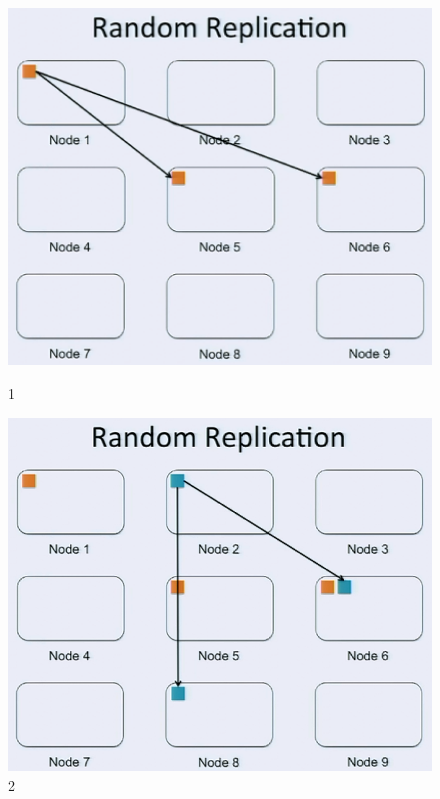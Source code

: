 \documentclass[xcolor=table]{beamer}
\begin{document}
	\begin{frame}
		\begin{figure}[htb]
			\begin{minipage}[b]{0.49\linewidth}
				\centering
				\graphicspath{{fig/}}
				\includegraphics[width=1\textwidth]{1.png}
				\caption{1}
			\end{minipage}
			\begin{minipage}[b]{0.49\linewidth}
				\centering
				\graphicspath{{fig/}}
				\includegraphics[width=1\textwidth]{2.png}
				\caption{2}
			\end{minipage}
		\end{figure}
	\end{frame}
\end{document}
